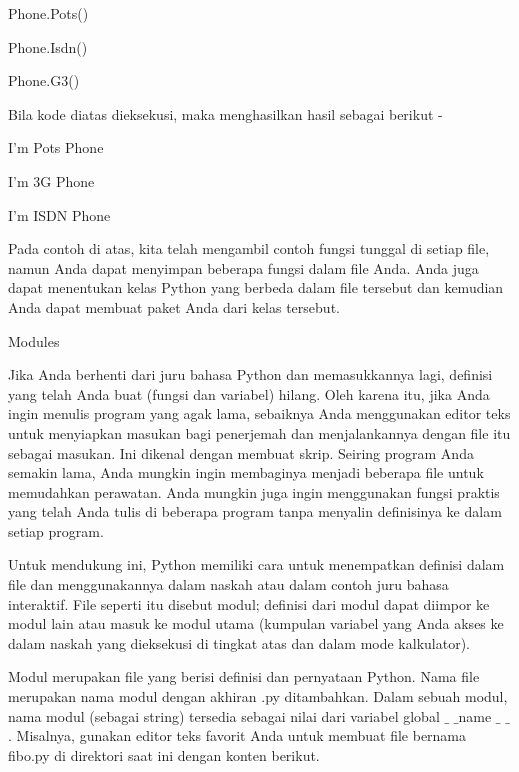 \vspace{12pt}
\noindent 
 \hspace*{0.5in} Phone.Pots() \par
\noindent 
 \hspace*{0.5in} Phone.Isdn() \par
\noindent 
 \hspace*{0.5in} Phone.G3() \par
\noindent 
Bila kode diatas dieksekusi, maka menghasilkan hasil sebagai berikut - \par
\noindent 
 \hspace*{0.5in} I'm Pots Phone \par
\noindent 
 \hspace*{0.5in} I'm 3G Phone \par
\noindent 
 \hspace*{0.5in} I'm ISDN Phone \par
\noindent 
Pada contoh di atas, kita telah mengambil contoh fungsi tunggal di setiap file, namun Anda dapat menyimpan beberapa fungsi dalam file Anda. Anda juga dapat menentukan kelas Python yang berbeda dalam file tersebut dan kemudian Anda dapat membuat paket Anda dari kelas tersebut. \par
\vspace{12pt}
\noindent 
Modules \par
\noindent 
Jika Anda berhenti dari juru bahasa Python dan memasukkannya lagi, definisi yang telah Anda buat (fungsi dan variabel) hilang. Oleh karena itu, jika Anda ingin menulis program yang agak lama, sebaiknya Anda menggunakan editor teks untuk menyiapkan masukan bagi penerjemah dan menjalankannya dengan file itu sebagai masukan. Ini dikenal dengan membuat skrip. Seiring program Anda semakin lama, Anda mungkin ingin membaginya menjadi beberapa file untuk memudahkan perawatan. Anda mungkin juga ingin menggunakan fungsi praktis yang telah Anda tulis di beberapa program tanpa menyalin definisinya ke dalam setiap program. \par
\noindent 
Untuk mendukung ini, Python memiliki cara untuk menempatkan definisi dalam file dan menggunakannya dalam naskah atau dalam contoh juru bahasa interaktif. File seperti itu disebut modul; definisi dari modul dapat diimpor ke modul lain atau masuk ke modul utama (kumpulan variabel yang Anda akses ke dalam naskah yang dieksekusi di tingkat atas dan dalam mode kalkulator). \par
\noindent 
Modul merupakan file yang berisi definisi dan pernyataan Python. Nama file merupakan nama modul dengan akhiran .py ditambahkan. Dalam sebuah modul, nama modul (sebagai string) tersedia sebagai nilai dari variabel global  $  \_  $ $  \_  $name $  \_  $ $  \_  $. Misalnya, gunakan editor teks favorit Anda untuk membuat file bernama fibo.py di direktori saat ini dengan konten berikut. \par

